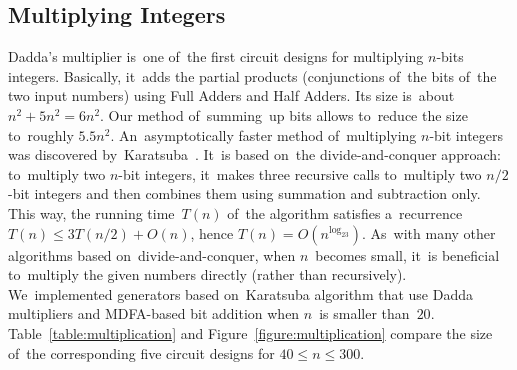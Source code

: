 \documentclass[a4paper, UKenglish, cleveref, autoref,  thm-restate]{lipics-v2021}
\begin{document}
    \subsection{Multiplying Integers}

    Dadda's multiplier is~one of~the first circuit designs for multiplying $n$-bits integers. Basically, it~adds the partial products (conjunctions of~the bits of~the
    two input numbers) using Full Adders and Half Adders. Its size is~about $n^2+5n^2=6n^2$. Our method of~summing~up bits allows to~reduce the size
    to~roughly $5.5n^2$. An~asymptotically faster method of~multiplying
    $n$-bit integers was discovered by~Karatsuba~\cite{karatsuba}. It~is based
    on~the divide-and-conquer approach: to~multiply two $n$-bit integers,
    it~makes three recursive calls to~multiply two $n/2$-bit integers and
    then combines them using summation and subtraction only. This way, the running
    time~$T(n)$ of~the algorithm satisfies a~recurrence $T(n) \le 3T(n/2)+O(n)$,
    hence $T(n)=O(n^{\log_23})$. As~with many other algorithms based on~divide-and-conquer, when $n$~becomes small, it~is beneficial to~multiply
    the given numbers directly (rather than recursively).
    We~implemented generators based on~Karatsuba algorithm that
    use Dadda multipliers and MDFA-based bit addition when $n$~is smaller than~$20$.
    Table~\ref{table:multiplication} and Figure~\ref{figure:multiplication}
    compare the size of~the corresponding five circuit designs for $40 \le n \le 300$.
\end{document}
